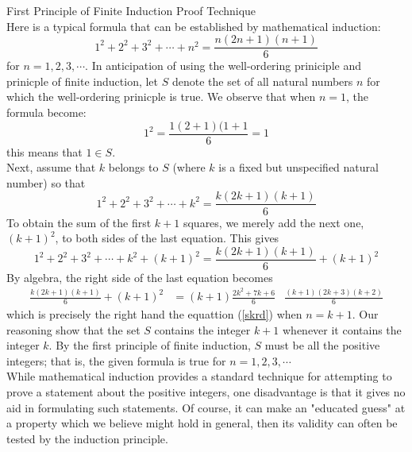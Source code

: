 \begin{definition}
First Principle of Finite Induction Proof Technique \\

Here is a typical formula that can be established by mathematical induction: 
    \begin{equation*}
    \label{skrd}
        1^2 + 2^2 + 3^2 + \cdots + n^2 = \frac{n(2n+1)(n+1)}{6} 
    \end{equation*}
for $n = 1, 2, 3 , \cdots$. In anticipation of using the well-ordering priniciple and prinicple of finite induction, let $S$ denote the set of all natural numbers $n$ for which the well-ordering prinicple is true. We observe that when $n=1$, the formula become: 
    \begin{equation*}
        1^2 = \frac{1(2+1)(1+1}{6}=1 \nonumber
    \end{equation*}
this means that $1 \in S$. \\
Next, assume that $k$ belongs to $S$ (where $k$ is a fixed but unspecified natural number) so that
    \begin{equation*}
        1^2 + 2^2 + 3^2 + \cdots + k^2 = \frac{k(2k+1)(k+1)}{6} \nonumber
    \end{equation*}
To obtain the sum of the first $k+1$ squares, we merely add the next one, $(k+1)^2$, to both sides of the last equation. This gives
    \begin{equation*}
        1^2 + 2^2 + 3^2 + \cdots + k^2 + (k+1)^2 = \frac{k(2k+1)(k+1)}{6} + (k+1)^2 \nonumber
    \end{equation*}
By algebra, the right side of the last equation becomes
    \begin{align*}
        \frac{k(2k+1)(k+1)}{6} + (k+1)^2 & = (k+1)\frac{2k^2+7k+6}{6}
            & \frac{(k+1)(2k+3)(k+2)}{6}
    \end{align*}
which is precisely the right hand the equattion (\ref{skrd}) when $n=k+1$. Our reasoning show that the set $S$ contains the integer $k+1$ whenever it contains the integer $k$. By the first principle of finite induction, $S$ must be all the positive integers; that is, the given formula is true for $n = 1,2,3, \cdots$ \\

While mathematical induction provides a standard technique for attempting to prove a statement about the positive integers, one disadvantage is that it gives no aid in formulating such statements. Of course, it can make an "educated guess" at a property which we believe might hold in general, then its validity can often be tested by the induction principle. \\


\end{definition}
